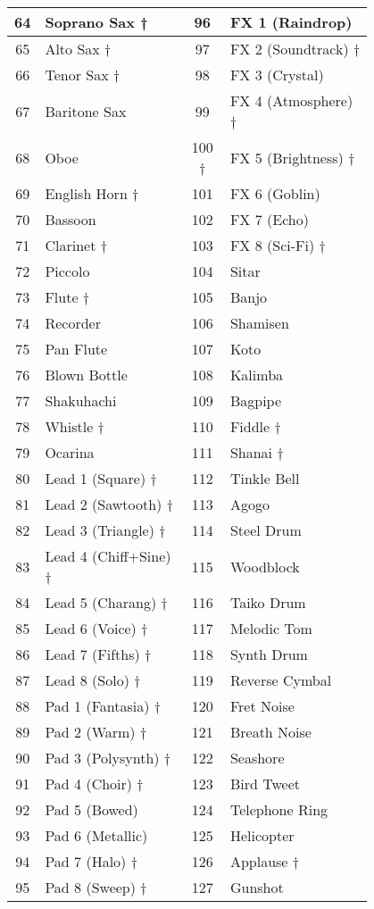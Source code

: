 \begin{tabular}{|c|p{0.4\linewidth}|c|p{0.4\linewidth}|}
	\hline
	64  &  Soprano Sax †& 96  &  FX 1 (Raindrop) \\ \hline
	65  &  Alto Sax † & 97  &  FX 2 (Soundtrack) † \\ \hline
	66  &  Tenor Sax † & 98 & FX 3 (Crystal) \\ \hline
	67  &  Baritone Sax & 99  &  FX 4 (Atmosphere) † \\ \hline
	68  &  Oboe & 100 †  &  FX 5 (Brightness) † \\ \hline
	69  &  English Horn † & 101  &  FX 6 (Goblin) \\ \hline
	70  &  Bassoon & 102  &  FX 7 (Echo) \\ \hline
	71  &  Clarinet † & 103  &  FX 8 (Sci-Fi) † \\ \hline
	72  &  Piccolo & 104  &  Sitar \\ \hline
	73  &  Flute † & 105  &  Banjo \\ \hline
	74  &  Recorder & 106  &  Shamisen \\ \hline
	75  &  Pan Flute & 107  &  Koto \\ \hline
	76  &  Blown Bottle & 108  &  Kalimba \\ \hline
	77  &  Shakuhachi & 109  &  Bagpipe \\ \hline
	78  &  Whistle † & 110  &  Fiddle † \\ \hline
	79  &  Ocarina & 111  &  Shanai † \\ \hline
	80  &  Lead 1 (Square) † & 112  &  Tinkle Bell \\ \hline
	81  &  Lead 2 (Sawtooth) † & 113  &  Agogo \\ \hline
	82  &  Lead 3 (Triangle) † & 114  &  Steel Drum \\ \hline
	83  &  Lead 4 (Chiff+Sine) † & 115  &  Woodblock \\ \hline
	84  &  Lead 5 (Charang) † & 116  &  Taiko Drum \\ \hline
	85  &  Lead 6 (Voice) † & 117  &  Melodic Tom \\ \hline
	86  &  Lead 7 (Fifths) † & 118  &  Synth Drum \\ \hline
	87  &  Lead 8 (Solo) † & 119  &  Reverse Cymbal \\ \hline
	88  &  Pad 1 (Fantasia) † & 120  &  Fret Noise \\ \hline
	89  &  Pad 2 (Warm) † & 121  &  Breath Noise \\ \hline
	90  &  Pad 3 (Polysynth) † & 122  &  Seashore \\ \hline
	91  &  Pad 4 (Choir) † & 123  &  Bird Tweet \\ \hline
	92  &  Pad 5 (Bowed) & 124  &  Telephone Ring \\ \hline
	93  &  Pad 6 (Metallic) & 125  &  Helicopter \\ \hline
	94  &  Pad 7 (Halo) † & 126  &  Applause † \\ \hline
	95  &  Pad 8 (Sweep) † & 127  &  Gunshot \\ \hline
\end{tabular}

